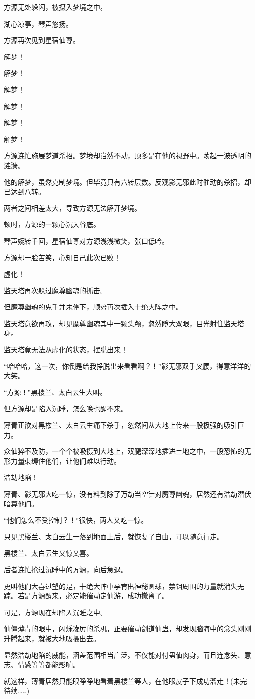 \begin{this_body}
方源无处躲闪，被摄入梦境之中。

湖心凉亭，琴声悠扬。

方源再次见到星宿仙尊。

解梦！

解梦！

解梦！

解梦！

解梦！

解梦！

方源连忙施展梦道杀招。梦境却岿然不动，顶多是在他的视野中。荡起一波透明的涟漪。

他的解梦，虽然克制梦境。但毕竟只有六转层数。反观影无邪此时催动的杀招，却已达到八转。

两者之间相差太大，导致方源无法解开梦境。

顿时，方源的一颗心沉入谷底。

琴声婉转千回，星宿仙尊对方源浅浅微笑，张口低吟。

方源却一脸苦笑，心知自己此次已败！

虚化！

监天塔再次躲过魔尊幽魂的抓击。

但魔尊幽魂的鬼手并未停下，顺势再次插入十绝大阵之中。

监天塔意欲再攻，却见魔尊幽魂其中一颗头颅，忽然瞪大双眼，目光射住监天塔身。

监天塔竟无法从虚化的状态，摆脱出来！

“哈哈哈，这一次，你倒是给我挣脱出来看看啊？！”影无邪双手叉腰，得意洋洋的大笑。

“方源！”黑楼兰、太白云生大叫。

但方源却是陷入沉睡，怎么唤也醒不来。

薄青正欲对黑楼兰、太白云生痛下杀手，忽然间从大地上传来一股极强的吸引巨力。

众仙猝不及防，一个个被吸摄到大地上，双腿深深地插进土地之中，一股恐怖的无形力量束缚住他们，让他们难以行动。

浩劫地陷！

薄青、影无邪大吃一惊，没有料到除了万劫当空针对魔尊幽魂，居然还有浩劫潜伏暗算他们。

“他们怎么不受控制？！”很快，两人又吃一惊。

只见黑楼兰、太白云生一落到地面上后，就恢复了自由，可以随意行走。

黑楼兰、太白云生又惊又喜。

后者连忙抢过沉睡中的方源，向后急退。

更叫他们大喜过望的是，十绝大阵中孕育出神秘圆球，禁锢周围的力量就消失无踪。若是方源醒来，必定能催动定仙游，成功撤离了。

可是，方源现在却陷入沉睡之中。

仙僵薄青的眼中，闪烁凌厉的杀机，正要催动剑道仙蛊，却发现脑海中的念头刚刚升腾起来，就被大地吸摄出去。

显然浩劫地陷的威能，涵盖范围相当广泛。不仅能对付蛊仙肉身，而且连念头、意志、情感等等都能影响。

就这样，薄青居然只能眼睁睁地看着黑楼兰等人，在他眼皮子下成功溜走！(未完待续……)

\end{this_body}

